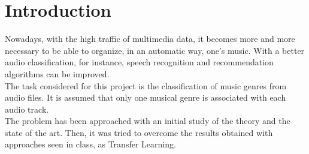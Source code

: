 \section{Introduction}
Nowadays, with the high traffic of multimedia data, it becomes more and more 
necessary to be able to organize, in an automatic way, one's music. 
With a better audio classification, for instance, speech recognition and recommendation algorithms can be improved. \\

The task considered for this project is the classification of music 
genres from audio files.
It is assumed that only one musical genre is associated with each audio track. \\

The problem has been approached with an initial study of the theory and the state of the art. 
Then, it was tried to overcome the results obtained with approaches seen in class, as Transfer Learning. \\
